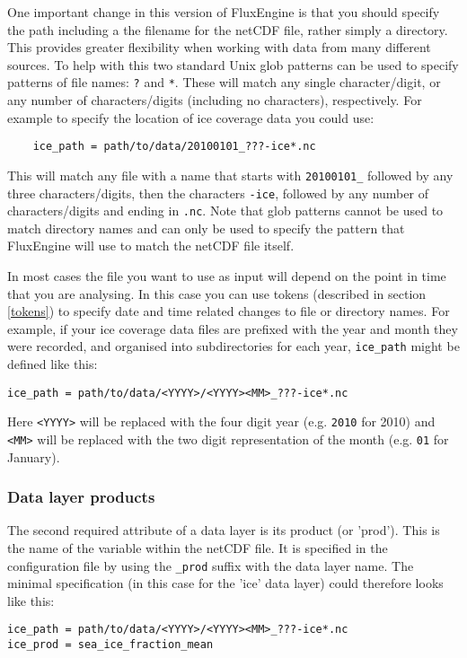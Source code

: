 \documentclass[]{scrartcl}
\begin{document}
{One important change in this version of FluxEngine is that you should specify the path including a the filename for the netCDF file, rather simply a directory. This provides greater flexibility when working with data from many different sources. To help with this two standard Unix glob patterns can be used to specify patterns of file names: \texttt{?} and \texttt{*}. These will match any single character/digit, or any number of characters/digits (including no characters), respectively. For example to specify the location of ice coverage data you could use:
\begin{lstlisting}
    ice_path = path/to/data/20100101_???-ice*.nc
\end{lstlisting}

This will match any file with a name that starts with \texttt{20100101\_} followed by any three characters/digits, then the characters \texttt{-ice}, followed by any number of characters/digits and ending in \texttt{.nc}. Note that glob patterns cannot be used to match directory names and can only be used to specify the pattern that FluxEngine will use to match the netCDF file itself.

In most cases the file you want to use as input will depend on the point in time that you are analysing. In this case you can use tokens (described in section \ref{tokens}) to specify date and time related changes to file or directory names. For example, if your ice coverage data files are prefixed with the year and month they were recorded, and organised into subdirectories for each year, \texttt{ice\_path} might be defined like this:
\begin{lstlisting}
ice_path = path/to/data/<YYYY>/<YYYY><MM>_???-ice*.nc
\end{lstlisting}

Here \texttt{<YYYY>} will be replaced with the four digit year (e.g. \texttt{2010} for 2010) and \texttt{<MM>} will be replaced with the two digit representation of the month (e.g. \texttt{01} for January).

\subsubsection*{Data layer products}
The second required attribute of a data layer is its product (or 'prod'). This is the name of the variable within the netCDF file. It is specified in the configuration file by using the \texttt{\_prod} suffix with the data layer name. The minimal specification (in this case for the 'ice' data layer) could therefore looks like this:
\begin{lstlisting}
ice_path = path/to/data/<YYYY>/<YYYY><MM>_???-ice*.nc
ice_prod = sea_ice_fraction_mean
\end{lstlisting}

}
\end{document}
